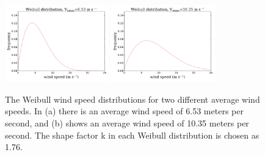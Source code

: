 \begin{figure}[htbp]
  \centering
  \includegraphics[width=0.4\textwidth]{Figures/weibull_6_53.pdf}\label{653}
  \includegraphics[width=0.4\textwidth]{Figures/weibull_10_35.pdf}\label{1035}
  \caption{\label{weibull} The Weibull wind speed distributions for two different average wind speeds. In (a) there is an average wind speed of 6.53 meters per second, and (b) shows an average wind speed of 10.35 meters per second. The shape factor k in each Weibull distribution is chosen as 1.76.}
\end{figure}



